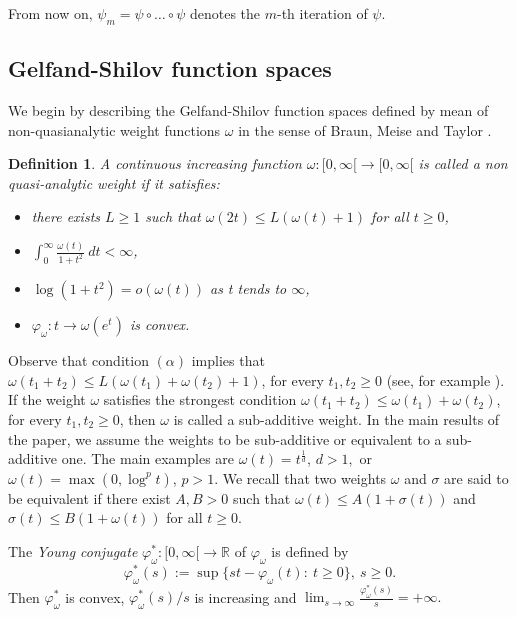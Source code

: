 \documentclass[12pt,reqno]{amsart} %
\newtheorem{definition}[theorem]{Definition}
\numberwithin{equation}{section}
\begin{document}
From now on, $\psi_m = \psi\circ\ldots\circ\psi$ denotes the $m$-th iteration of $\psi.$


\medskip
\subsection{Gelfand-Shilov function spaces}\label{sec1.1}
We begin by describing the Gelfand-Shilov function spaces defined by mean  of non-quasianalytic weight functions $\omega$ in the sense of Braun, Meise and Taylor \cite{bmt}.

\begin{definition}\label{def:weight} A continuous increasing function $\omega :[0,\infty [\longrightarrow [0,\infty [$ is called a {\it non quasi-analytic weight} if it satisfies:
	\begin{itemize}
		\item[$(\alpha)$] there exists $L\geq 1$ such that $\omega (2t) \leq L(\omega (t)+1)$ for
		all $t\geq 0$,
		\item[$(\beta)$] $\displaystyle\int_{0}^{\infty}\frac{\omega (t)}{1+t^{2}}\ dt < \infty $,
		\item[$(\gamma)$] $\log(1+t^{2})=o(\omega (t))$ as t tends to $\infty$,
		\item[$(\delta)$] $\varphi_\omega :t\rightarrow \omega (e^{t})$ is convex.
	\end{itemize}
\end{definition}

Observe that condition $(\alpha)$ implies that $\omega(t_1+t_2)\leq L (\omega(t_1)+\omega(t_2)+1)$, for every $t_1, t_2\geq 0$ (see, for example \cite[Remark 2.2(1)]{paley}). If the weight $\omega$ satisfies the strongest  condition $\omega(t_1+t_2)\leq \omega(t_1) + \omega(t_2)$, for every $t_1, t_2\geq 0$, then $\omega$ is called a sub-additive weight.
In the main results of the paper,  we assume the weights to be sub-additive
or equivalent to a sub-additive one. The main examples are $\omega(t) = t^{\frac{1}{d}}$, $d>1,$ or $\omega(t) = \max\left(0, \log^p t\right)$, $p > 1.$ We recall that two weights $\omega$ and $\sigma$ are said to be equivalent if there exist $A, B > 0$ such that $\omega(t) \leq A\left(1 + \sigma(t)\right)$ and $\sigma(t) \leq B\left(1 + \omega(t)\right)$ for all $t\geq 0.$ 
\par\medskip
The {\it Young conjugate} $\varphi_\omega ^{*}:[0,\infty [ \longrightarrow {\mathbb R}$  of
$\varphi_\omega$ is defined by
$$
\varphi_\omega^{*}(s):=\sup\{ st-\varphi_\omega (t):\ t\geq 0\},\ s\geq 0.
$$ Then $\varphi_\omega^\ast$ is convex, $\varphi_\omega^\ast(s)/s$ is increasing and $\displaystyle\lim_{s\to \infty}\frac{\varphi_\omega^\ast(s)}{s} = +\infty.$ 
\end{document}
